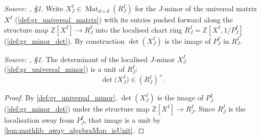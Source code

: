 \begin{definition}\leanok
  \label{def:gr_universal_minor}
  \textit{Source: \cite{nitsure-hilbert-quot}, \S 1.}
  Write \(X^I_J \in \operatorname{Mat}_{d \times d}(R^I_J)\) for the \(J\)-minor of
  the universal matrix \(X^I\) (\cref{def:gr_universal_matrix}) with its entries
  pushed forward along the structure map \(\mathbb{Z}[X^I] \to R^I_J\) into the
  localised chart ring \(R^I_J = \mathbb{Z}[X^I, 1/P^I_J]\)
  (\cref{def:gr_minor_det}). By construction \(\det(X^I_J)\) is the image of
  \(P^I_J\) in \(R^I_J\).
\end{definition}

\begin{lemma}\leanok
  \label{lem:gr_minorDet_unit}
  \textit{Source: \cite{nitsure-hilbert-quot}, \S 1.}
  The determinant of the localised \(J\)-minor \(X^I_J\)
  (\cref{def:gr_universal_minor}) is a unit of \(R^I_J\):
  \[
    \det\bigl(X^I_J\bigr) \in (R^I_J)^{\times}.
  \]
\end{lemma}
\begin{proof}
  \leanok
  By \cref{def:gr_universal_minor}, \(\det(X^I_J)\) is the image of \(P^I_J\)
  (\cref{def:gr_minor_det}) under the structure map
  \(\mathbb{Z}[X^I] \to R^I_J\). Since \(R^I_J\) is the localisation away from
  \(P^I_J\), that image is a unit by
  \cref{lem:mathlib_away_algebraMap_isUnit}.
\end{proof}

